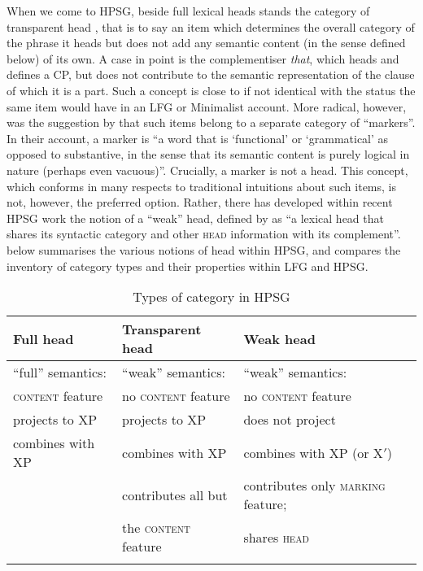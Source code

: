 \documentclass[output=paper]{langsci/langscibook}
\begin{document}
When we come to \gls{HPSG}, beside full lexical heads stands the category of
transparent head \citep{Flickinger08}, that is to say an item which determines
the overall category of the phrase it heads but does not add any semantic
content (in the sense defined below) of its own. A case in point is the 
complementiser \emph{that}, which heads and defines a CP, but does not
contribute to the semantic representation of the clause of which it is a part.
Such a concept is close to if not identical with the status the same item would
have in an \gls{LFG} or Minimalist account. More radical, however, was the
suggestion by \cite[44--46]{PollSag94} that such items belong to a separate
category of \enquote{markers}. In their account, a marker is ``a word that is
`functional' or `grammatical' as opposed to substantive, in the sense that its
semantic content is purely logical in nature (perhaps even vacuous)''.
Crucially, a marker is not a head. This concept, which conforms in many
respects to traditional intuitions about such items, is not, however, the
preferred option. Rather, there has developed within recent
\gls{HPSG} work the notion of a
\enquote{weak} head, defined by \cite[156]{Abeilleetal06} as ``a lexical head
that shares its syntactic category and other
\textsc{head} information with its complement''.  below
summarises the various notions of head within \gls{HPSG}, and  compares the inventory of
category types and their properties within \gls{LFG} and \gls{HPSG}.

\begin{table}
\caption{Types of category in HPSG\label{Fig2HPSGCats}}
 \begin{tabular}{lll}
  \lsptoprule
       Full head &Transparent head & Weak head\\
  \midrule
     \addlinespace[1ex]\enquote{full} semantics:  &    \enquote{weak} semantics:  &    \enquote{weak} semantics:     \\
     \textsc{content} feature &  no \textsc{content} feature &  no \textsc{content} feature\\
     \addlinespace[1ex]projects to XP &   projects to XP &    does not project    \\
     \addlinespace[1ex] combines with XP   & combines with XP & combines with XP (or X$'$)\\
         &  contributes all but  & contributes only \textsc{marking} feature; \\
      & the \textsc{content} feature & shares \textsc{head}\\
  \lspbottomrule
 \end{tabular}
\end{table}
\end{document}
